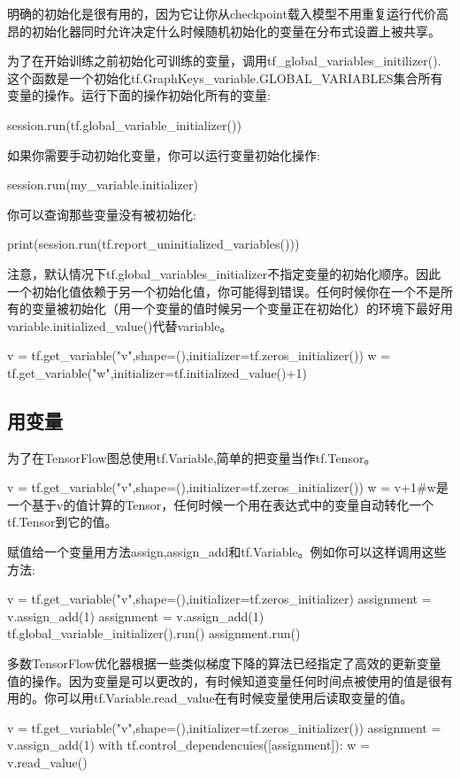 明确的初始化是很有用的，因为它让你从checkpoint载入模型不用重复运行代价高昂的初始化器同时允许决定什么时候随机初始化的变量在分布式设置上被共享。

为了在开始训练之前初始化可训练的变量，调用tf\_global\_variables\_initilizer().这个函数是一个初始化tf.GraphKeys\_variable.GLOBAL\_VARIABLES集合所有变量的操作。运行下面的操作初始化所有的变量:
\begin{python}
session.run(tf.global_variable_initializer())
\end{python}
如果你需要手动初始化变量，你可以运行变量初始化操作:
\begin{python}
session.run(my_variable.initializer)
\end{python}
你可以查询那些变量没有被初始化:
\begin{python}
print(session.run(tf.report_uninitialized_variables()))
\end{python}
注意，默认情况下tf.global\_variables\_initializer不指定变量的初始化顺序。因此一个初始化值依赖于另一个初始化值，你可能得到错误。任何时候你在一个不是所有的变量被初始化（用一个变量的值时候另一个变量正在初始化）的环境下最好用variable.initialized\_value()代替variable。
\begin{python}
v = tf.get_variable("v",shape=(),initializer=tf.zeros_initializer())
w = tf.get_variable("w",initializer=tf.initialized_value()+1)
\end{python}
\subsection{用变量}
为了在TensorFlow图总使用tf.Variable,简单的把变量当作tf.Tensor。
\begin{python}
v = tf.get_variable("v",shape=(),initializer=tf.zeros_initializer())
w = v+1#w是一个基于v的值计算的Tensor，任何时候一个用在表达式中的变量自动转化一个tf.Tensor到它的值。
\end{python}
赋值给一个变量用方法assign,assign\_add和tf.Variable。例如你可以这样调用这些方法:
\begin{python}
v = tf.get_variable("v",shape=(),initializer=tf.zeros_initializer)
	assignment = v.assign_add(1)
assignment = v.assign_add(1)
tf.global_variable_initializer().run()
assignment.run()
\end{python}
多数TensorFlow优化器根据一些类似梯度下降的算法已经指定了高效的更新变量值的操作。因为变量是可以更改的，有时候知道变量任何时间点被使用的值是很有用的。你可以用tf.Variable.read\_value在有时候变量使用后读取变量的值。
\begin{python}
v = tf.get_variable("v",shape=(),initializer=tf.zeros_initializer())
assignment = v.assign_add(1)
with tf.control_dependencuies([assignment]):
    w = v.read_value()
\end{python}
